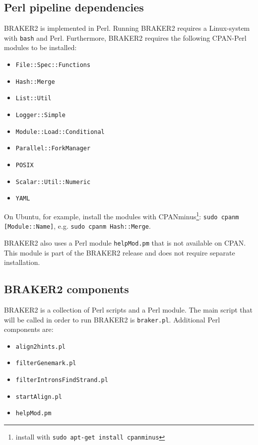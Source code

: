 \documentclass[a4paper,10pt]{report}
\begin{document}
\subsection{Perl pipeline dependencies}

BRAKER2 is implemented in Perl. Running BRAKER2 requires a Linux-system with \texttt{bash} and Perl. Furthermore, BRAKER2 requires the following CPAN-Perl modules to be installed:

\begin{itemize}
 \item 		  \texttt{File::Spec::Functions}
				\item \texttt{Hash::Merge}
				\item \texttt{List::Util}
				\item \texttt{Logger::Simple}
				\item \texttt{Module::Load::Conditional}
				\item \texttt{Parallel::ForkManager}
				\item \texttt{POSIX}
				\item \texttt{Scalar::Util::Numeric}
				\item \texttt{YAML}
\end{itemize}

   	On Ubuntu, for example, install the modules with CPANminus\footnote{install with \texttt{sudo apt-get install cpanminus}}: \texttt{sudo cpanm [Module::Name]}, e.g. \texttt{sudo cpanm Hash::Merge}.

   BRAKER2 also uses a Perl module \texttt{helpMod.pm} that is not available on CPAN. This module is 
   part of the BRAKER2 release and does not require separate installation.  

\subsection{BRAKER2 components} \label{Executability}

BRAKER2 is a collection of Perl scripts and a Perl module. The main script that will be called in order to run BRAKER2 is \texttt{braker.pl}. Additional Perl components are:

\begin{itemize}
\item \texttt{align2hints.pl}
\item \texttt{filterGenemark.pl}
\item \texttt{filterIntronsFindStrand.pl}
\item \texttt{startAlign.pl}
\item \texttt{helpMod.pm}
\end{itemize}
\end{document}
